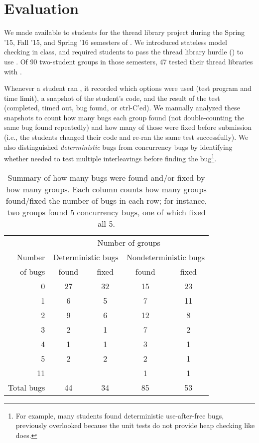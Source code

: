 \section{Evaluation}
\label{sec:eval}

We made \landslide available to students for the thread library project
during the Spring '15, Fall '15, and Spring '16 semesters of \fourten.
We introduced stateless model checking in class, %
and required students to pass the thread library hurdle (\sect{\ref{sec:grading}}) to use \landslide.
Of 90 two-student groups in those semesters, 47 tested their thread libraries with \landslide.

Whenever a student ran \landslide,
it recorded which options were used (test program and time limit),
a snapshot of the student's code,
and the result of the test (completed, timed out, bug found, or ctrl-C'ed).
%
We manually analyzed these snapshots to count how many bugs each group found
(not double-counting the same bug found repeatedly)
and how many of those were fixed before submission
(i.e., the students changed their code and re-ran the same test successfully).
%
We also distinguished {\em deterministic} bugs from concurrency bugs
by identifying whether \landslide needed to test multiple interleavings before finding the bug\footnote{
	For example, many students found deterministic use-after-free bugs,
	previously overlooked because the unit tests do not provide heap checking like \landslide does.
}.

\begin{table}[t]
	\begin{tabular}{r|cc|cc}
	& \multicolumn{4}{c}{Number of groups} \\
	Number & \multicolumn{2}{c|}{Deterministic bugs} & \multicolumn{2}{c}{Nondeterministic bugs} \\
	of bugs	& found & fixed & found & fixed \\
	\hline
	0	& 27	& 32	& 15	& 23	\\
	1	& 6	& 5	& 7	& 11	\\
	2	& 9	& 6	& 12	& 8	\\
	3	& 2	& 1	& 7	& 2	\\
	4	& 1	& 1	& 3	& 1	\\
	5	& 2	& 2	& 2	& 1	\\
	11	& 	& 	& 1	& 1	\\
	\hline
	Total bugs
		& 44	& 34	& 85	& 53	\\
	\end{tabular}
	\caption{Summary of how many bugs were found and/or fixed by how many groups.
	Each column counts how many groups found/fixed the number of bugs in each row;
	for instance, two groups found 5 concurrency bugs, one of which fixed all 5.}
	\label{tab:this-table-sucks-but-it's-the-best-i-got}
\end{table}

